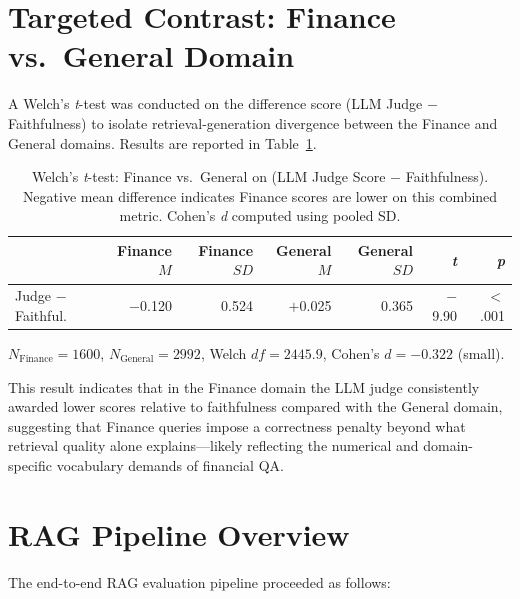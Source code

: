 \documentclass[12pt]{article}
\begin{document}
\section{Targeted Contrast: Finance vs.\ General Domain}
\label{app:contrast}

A Welch's \textit{t}-test was conducted on the difference score
(LLM Judge $-$ Faithfulness) to isolate retrieval-generation divergence
between the Finance and General domains. Results are reported in
Table~\ref{tab:targeted_contrast}.

\begin{table}[h]
\centering
\caption{Welch's \textit{t}-test: Finance vs.\ General on
  (LLM Judge Score $-$ Faithfulness). Negative mean difference indicates
  Finance scores are lower on this combined metric. Cohen's \textit{d}
  computed using pooled SD.}
\label{tab:targeted_contrast}
\begin{tabular}{lrrrrrr}
\toprule
 & \textbf{Finance} $M$ & \textbf{Finance} $SD$
 & \textbf{General} $M$ & \textbf{General} $SD$
 & \textbf{\textit{t}} & \textbf{\textit{p}} \\
\midrule
Judge $-$ Faithful. & $-$0.120 & 0.524 & $+$0.025 & 0.365 & $-$9.90 & $<$.001 \\
\bottomrule
\end{tabular}

\smallskip
{\small $N_{\text{Finance}} = 1600$, $N_{\text{General}} = 2992$,
Welch $df = 2445.9$, Cohen's $d = -0.322$ (small).}
\end{table}

This result indicates that in the Finance domain the LLM judge consistently
awarded lower scores relative to faithfulness compared with the General domain,
suggesting that Finance queries impose a correctness penalty beyond what
retrieval quality alone explains---likely reflecting the numerical and
domain-specific vocabulary demands of financial QA.

\section{RAG Pipeline Overview}
\label{app:pipeline}

The end-to-end RAG evaluation pipeline proceeded as follows:
\end{document}
